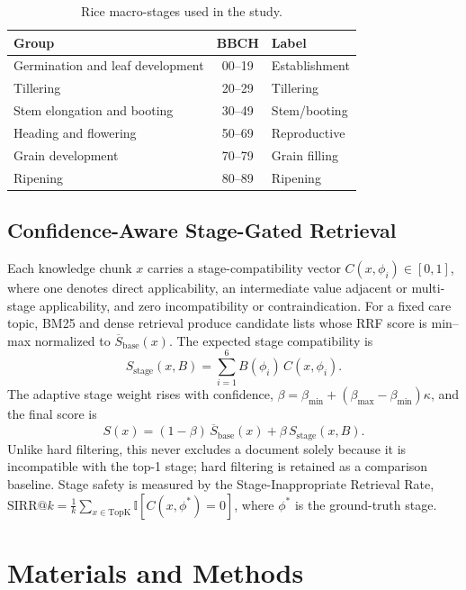 \documentclass[conference]{IEEEtran}
\begin{document}
\begin{table}[t]
\centering
\caption{Rice macro-stages used in the study.}
\label{tab:stages}
\begin{tabular}{lcl}
\toprule
\textbf{Group} & \textbf{BBCH} & \textbf{Label} \\
\midrule
Germination and leaf development & 00--19 & Establishment \\
Tillering & 20--29 & Tillering \\
Stem elongation and booting & 30--49 & Stem/booting \\
Heading and flowering & 50--69 & Reproductive \\
Grain development & 70--79 & Grain filling \\
Ripening & 80--89 & Ripening \\
\bottomrule
\end{tabular}
\end{table}

\subsection{Confidence-Aware Stage-Gated Retrieval}

Each knowledge chunk $x$ carries a stage-compatibility vector $C(x,\phi_i)\in[0,1]$, where one denotes direct applicability, an intermediate value adjacent or multi-stage applicability, and zero incompatibility or contraindication. For a fixed care topic, BM25 and dense retrieval produce candidate lists whose RRF score is min--max normalized to $\overline{S}_{\mathrm{base}}(x)$. The expected stage compatibility is
\begin{equation}
S_{\mathrm{stage}}(x,B)=\sum_{i=1}^{6}B(\phi_i)\,C(x,\phi_i).
\end{equation}
The adaptive stage weight rises with confidence, $\beta=\beta_{\min}+(\beta_{\max}-\beta_{\min})\kappa$, and the final score is
\begin{equation}
S(x)=(1-\beta)\,\overline{S}_{\mathrm{base}}(x)+\beta\,S_{\mathrm{stage}}(x,B).
\end{equation}
Unlike hard filtering, this never excludes a document solely because it is incompatible with the top-1 stage; hard filtering is retained as a comparison baseline. Stage safety is measured by the Stage-Inappropriate Retrieval Rate, $\mathrm{SIRR}@k=\frac{1}{k}\sum_{x\in\mathrm{TopK}}\mathbb{I}[C(x,\phi^*)=0]$, where $\phi^*$ is the ground-truth stage.

\section{Materials and Methods}
\end{document}
